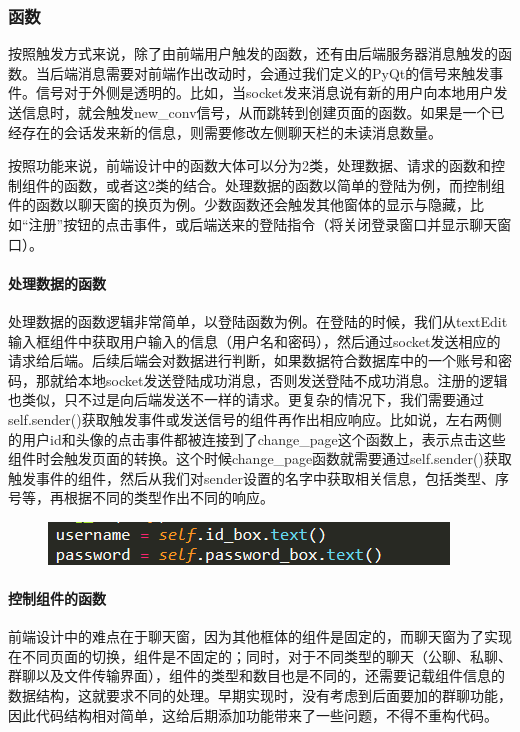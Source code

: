 \documentclass[12pt]{article} %
\begin{document}
\begin{sloppypar}
\subsubsection{函数}

按照触发方式来说，除了由前端用户触发的函数，还有由后端服务器消息触发的函数。当后端消息需要对前端作出改动时，会通过我们定义的PyQt的信号来触发事件。信号对于外侧是透明的。比如，当socket发来消息说有新的用户向本地用户发送信息时，就会触发new\_conv信号，从而跳转到创建页面的函数。如果是一个已经存在的会话发来新的信息，则需要修改左侧聊天栏的未读消息数量。

按照功能来说，前端设计中的函数大体可以分为2类，处理数据、请求的函数和控制组件的函数，或者这2类的结合。处理数据的函数以简单的登陆为例，而控制组件的函数以聊天窗的换页为例。少数函数还会触发其他窗体的显示与隐藏，比如“注册”按钮的点击事件，或后端送来的登陆指令（将关闭登录窗口并显示聊天窗口）。

\paragraph{处理数据的函数}
处理数据的函数逻辑非常简单，以登陆函数为例。在登陆的时候，我们从textEdit输入框组件中获取用户输入的信息（用户名和密码），然后通过socket发送相应的请求给后端。后续后端会对数据进行判断，如果数据符合数据库中的一个账号和密码，那就给本地socket发送登陆成功消息，否则发送登陆不成功消息。注册的逻辑也类似，只不过是向后端发送不一样的请求。更复杂的情况下，我们需要通过self.sender()获取触发事件或发送信号的组件再作出相应响应。比如说，左右两侧的用户id和头像的点击事件都被连接到了change\_page这个函数上，表示点击这些组件时会触发页面的转换。这个时候change\_page函数就需要通过self.sender()获取触发事件的组件，然后从我们对sender设置的名字中获取相关信息，包括类型、序号等，再根据不同的类型作出不同的响应。

\begin{figure}[htbp]
	\centering
	\includegraphics[width=0.6\linewidth]{figure/fig1.png}
\end{figure}

\paragraph{控制组件的函数}

前端设计中的难点在于聊天窗，因为其他框体的组件是固定的，而聊天窗为了实现在不同页面的切换，组件是不固定的；同时，对于不同类型的聊天（公聊、私聊、群聊以及文件传输界面），组件的类型和数目也是不同的，还需要记载组件信息的数据结构，这就要求不同的处理。早期实现时，没有考虑到后面要加的群聊功能，因此代码结构相对简单，这给后期添加功能带来了一些问题，不得不重构代码。


\end{sloppypar}
\end{document}
